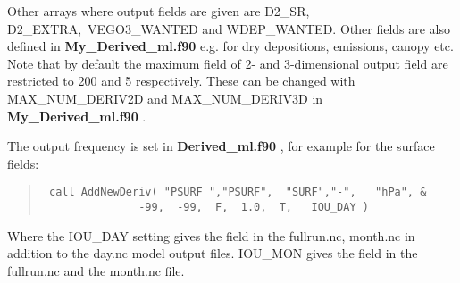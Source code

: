 Other arrays where output fields are given are D2\_SR, D2\_EXTRA,\
 VEGO3\_WANTED and 
WDEP\_WANTED. Other fields are also defined in { \bf My\_Derived\_ml.f90 } e.g. for dry 
depositions, emissions, canopy etc. \\



Note that by default the maximum field of 2- and 3-dimensional output field are 
restricted to 200 and 5 respectively. These can be changed with MAX\_NUM\_DERIV2D and MAX\_NUM\_DERIV3D 
in { \bf My\_Derived\_ml.f90 }.


The output frequency is set in { \bf Derived\_ml.f90 }, for example for the surface fields:
\begin{quote}
\begin{verbatim}
 call AddNewDeriv( "PSURF ","PSURF",  "SURF","-",   "hPa", &
               -99,  -99,  F,  1.0,  T,   IOU_DAY )
\end{verbatim}
\end{quote}
 Where the IOU\_DAY setting gives the field in the fullrun.nc, month.nc in addition to the day.nc 
model output files. IOU\_MON gives the field in the fullrun.nc and the month.nc file. 



